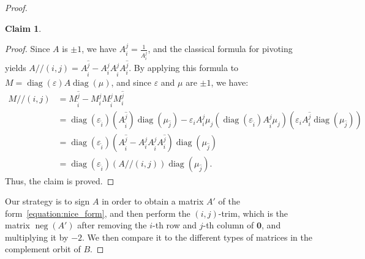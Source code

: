 \documentclass[10pt,a4paper]{amsart}
\newtheorem{claim}{Claim}
\DeclareMathOperator{\diag}{diag}
\DeclareMathOperator{\nega}{neg}
\newcommand{\trim}{/\!\!/}
\begin{document}
\begin{proof}
\begin{claim}
\end{claim}
\begin{proof}
Since $A$ is $\pm1$, we have $A_i^j =\frac{1}{A_i^j}$, and the classical formula for pivoting yields 
$A\trim (i,j) = A_{\widehat{i}}^{\widehat{j}} - A_i^j A_{\widehat{i}}^{j} A_{i}^{\widehat{j}}$.
By applying this formula to $M=\diag(\varepsilon)A\diag(\mu)$, and since $\varepsilon$ and $\mu$ are $\pm1$, we have:
\begin{align*}
	M\trim (i,j) &= M_{\widehat{i}}^{\widehat{j}} - M_i^j M_{\widehat{i}}^{j} M_{i}^{\widehat{j}} \\ &= \diag(\varepsilon_{\widehat{i}})(A_{\widehat{i}}^{\widehat{j}})\diag(\mu_{\widehat{j}}) - \varepsilon_iA_i^j\mu_j (\diag(\varepsilon_{\widehat{i}})A_{\widehat{i}}^{j} \mu_j)(\varepsilon_i A_{i}^{\widehat{j}}\diag(\mu_{\widehat{j}}))\\
	&=\diag(\varepsilon_{\widehat{i}})\left(A_{\widehat{i}}^{\widehat{j}} - A_i^j A_{\widehat{i}}^{j} A_{i}^{\widehat{j}}\right)\diag(\mu_{\widehat{j}})\\
	&= \diag(\varepsilon_{\widehat{i}})(A\trim(i,j))\diag(\mu_{\widehat{j}}).
\end{align*}
Thus, the claim is proved.
\end{proof}
Our strategy is to sign $A$ in order to obtain a matrix $A'$ of the form~\eqref{equation:nice_form}, and then perform the $(i,j)$-trim, which is the matrix $\nega{(A')}$ after removing the $i$-th row and $j$-th column of $\mathbf{0}$, and multiplying it by $-2$.
We then compare it to the different types of matrices in the complement orbit of $B$.

\end{proof}
\end{document}

